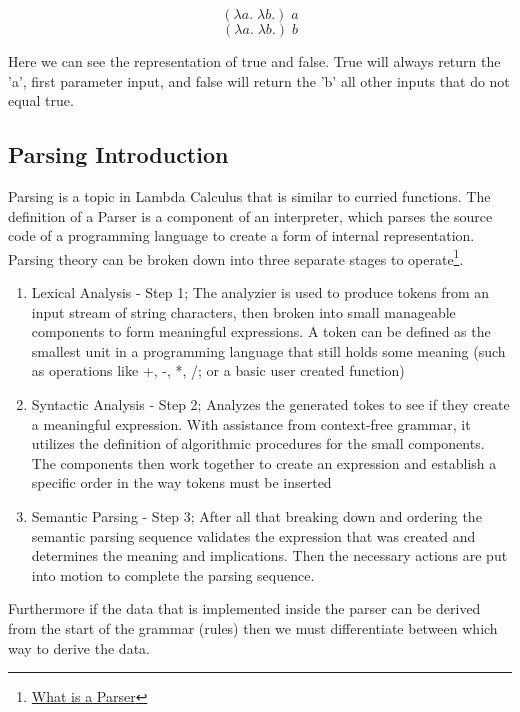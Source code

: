 \documentclass{article}
\begin{document}
    $$(\lambda a. \; \lambda b. )\; a$$
    $$(\lambda a. \; \lambda b. )\; b$$
    
    Here we can see the representation of true and false. True will always return the 'a', first parameter input, and false will return the 'b' all other inputs that do not equal true.
        
    
    \subsection{Parsing Introduction}
    Parsing is a topic in Lambda Calculus that is similar to curried functions. The definition of a Parser is a component of an interpreter, which parses the source code of a programming language to create a form of internal representation. Parsing theory can be broken down into three separate stages to operate\footnote{\href{https://www.techopedia.com/definition/3854/parser}{What is a Parser}}.
    
    \begin{enumerate}
        \item Lexical Analysis - Step 1; The analyzier is used to produce tokens from an input stream of string characters, then broken into small manageable components to form meaningful expressions. A token can be defined as the smallest unit in a programming language that still holds some meaning (such as operations like +, -, *, /; or a basic user created function)
        \item Syntactic Analysis - Step 2; Analyzes the generated tokes to see if they create a meaningful expression. With assistance from context-free grammar, it utilizes the definition of algorithmic procedures for the small components. The components then work together to create an expression and establish a specific order in the way tokens must be inserted
        \item Semantic Parsing - Step 3; After all that breaking down and ordering the semantic parsing sequence validates the expression that was created and determines the meaning and implications. Then the necessary actions are put into motion to complete the parsing sequence.
    \end{enumerate}
    
    \noindent Furthermore if the data that is implemented inside the parser can be derived from the start of the grammar (rules) then we must differentiate between which way to derive the data.
    
\end{document}
